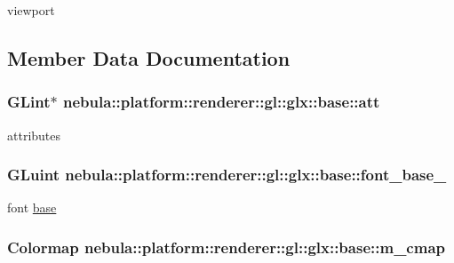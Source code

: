 viewport 

\subsection{Member Data Documentation}
\hypertarget{classnebula_1_1platform_1_1renderer_1_1gl_1_1glx_1_1base_aac9ff579604bfe3676c7fdeba253c3d7}{
\subsubsection[{att}]{\setlength{\rightskip}{0pt plus 5cm}GLint$\ast$ {\bf nebula::platform::renderer::gl::glx::base::att}}}
\label{classnebula_1_1platform_1_1renderer_1_1gl_1_1glx_1_1base_aac9ff579604bfe3676c7fdeba253c3d7}


attributes \hypertarget{classnebula_1_1platform_1_1renderer_1_1gl_1_1glx_1_1base_a4b22e4309d1238b47127d2bec9fb6138}{
\subsubsection[{font\_\-base\_\-}]{\setlength{\rightskip}{0pt plus 5cm}GLuint {\bf nebula::platform::renderer::gl::glx::base::font\_\-base\_\-}}}
\label{classnebula_1_1platform_1_1renderer_1_1gl_1_1glx_1_1base_a4b22e4309d1238b47127d2bec9fb6138}


font \hyperlink{classnebula_1_1platform_1_1renderer_1_1gl_1_1glx_1_1base}{base} \hypertarget{classnebula_1_1platform_1_1renderer_1_1gl_1_1glx_1_1base_a15dfd5db19d14a9b1b4ce038e9168545}{
\subsubsection[{m\_\-cmap}]{\setlength{\rightskip}{0pt plus 5cm}Colormap {\bf nebula::platform::renderer::gl::glx::base::m\_\-cmap}}}
\label{classnebula_1_1platform_1_1renderer_1_1gl_1_1glx_1_1base_a15dfd5db19d14a9b1b4ce038e9168545}


